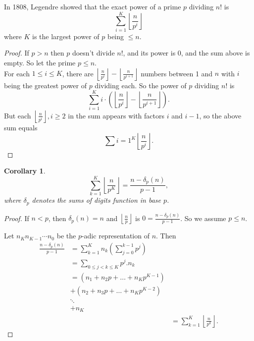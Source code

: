 \documentclass[12pt]{article}
\newtheorem*{cor}{Corollary}
\begin{document}
In 1808, Legendre showed that the exact power of a prime $p$ dividing
$n!$ is
\[\sum_{i=1}^K \left\lfloor \frac{n}{p^i} \right\rfloor\]
where $K$ is the largest power of $p$ being $\leq n$.

\begin{proof}
If $p>n$ then $p$ doesn't divide $n!$, and its power is 0, and the sum
above is
empty. So let the prime $p \le n$. \\
For each $1 \le i \le K$, there are $\left\lfloor \frac{n}{p^i}
\right\rfloor
-\left\lfloor \frac{n}{p^{i+1}} \right\rfloor$ numbers between 1 and
$n$ with
$i$ being the greatest power of $p$ dividing each. So the power of $p$
dividing $n!$ is
\[\sum_{i=1}^K i\cdot \left(\left\lfloor \frac{n}{p^i} \right\rfloor
-\left\lfloor \frac{n}{p^{i+1}} \right\rfloor\right).\]
But each $\left\lfloor \frac{n}{p^i} \right\rfloor, i \ge 2$ in the
sum appears with factors $i$
and $i-1$, so the above sum equals
\[\sum{i=1}^K \left\lfloor \frac{n}{p^i} \right\rfloor.\]
\end{proof}
\begin{cor}
\[\sum_{k=1}^K \left\lfloor \frac{n}{p^K} \right\rfloor =\frac{n
-\delta_p(n)}{p-1},\]
where $\delta_p$ denotes the sums of digits function in base $p$.
\end{cor}
\begin{proof}
If $n < p$, then $\delta_p(n) =n$ and $\left\lfloor \frac{n}{p} \right\rfloor$
is $0 =\frac{n -\delta_p(n)}{p-1}$. So we assume $p \leq n$.

Let $n_Kn_{K-1}\cdots n_0$ be the $p$-adic representation of $n$. Then
\begin{eqnarray*}
\frac{n -\delta_p(n)}{p-1} &= \sum_{k=1}^K n_k\left(\sum_{j=0}^{k-1} p^j\right)
\\
&=\sum_{0 \le j < k \le K} p^j.n_k  \\
&=\left(n_1 +n_2p +\ldots +n_Kp^{K-1}\right)
\\
&+\left(n_2 +n_3p +\ldots +n_Kp^{K-2}\right) \\
& \ddots \\
& +n_K \\
&&= \sum_{k=1}^K \left\lfloor \frac{n}{p^k}\right\rfloor.
\end{eqnarray*}
\end{proof}
\end{document}
